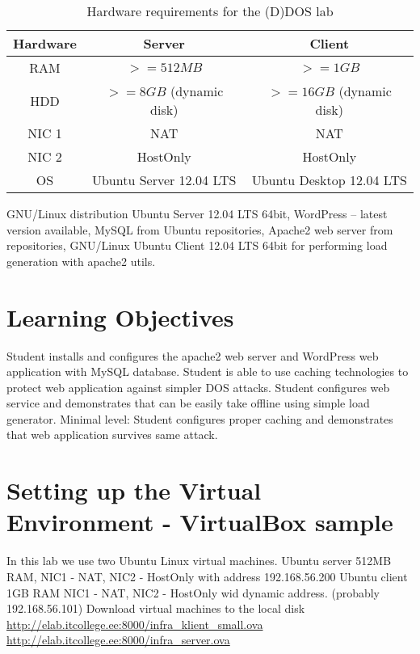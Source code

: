 \begin{table}
\centering
\caption{Hardware requirements for the (D)DOS lab}
\begin{tabular}{|c|c|c|}
\hline 
\rule[-1ex]{0pt}{2.5ex} Hardware & Server & Client \\ 
\hline 
\rule[-1ex]{0pt}{2.5ex} RAM & $>=512MB$ & $>=1GB$\\ 
\hline
\rule[-1ex]{0pt}{2.5ex} HDD & $>=8GB$ (dynamic disk) & $>=16GB$ (dynamic disk)\\ 
\hline 
\rule[-1ex]{0pt}{2.5ex} NIC 1 & NAT  & NAT \\ 
\hline 
\rule[-1ex]{0pt}{2.5ex} NIC 2 & HostOnly & HostOnly \\ 
\hline 
\rule[-1ex]{0pt}{2.5ex} OS & Ubuntu Server 12.04 LTS & Ubuntu Desktop 12.04 LTS\\ 
\hline 
\end{tabular}
\label{table:HW for Wordpress lab}
\end{table}

GNU/Linux distribution Ubuntu Server 12.04 LTS 64bit, WordPress -- latest version available, MySQL from Ubuntu repositories, Apache2 web server from repositories, GNU/Linux Ubuntu Client 12.04 LTS 64bit for performing load generation with apache2 utils.

\section{Learning Objectives}
Student installs and configures the apache2 web server and WordPress web application with \gls{MySQL} database.
Student is able to use caching technologies to protect web application against simpler DOS attacks. Student configures web service and demonstrates that can be
easily take offline using simple load generator. Minimal level: Student configures
proper caching and demonstrates that web application survives same attack.
\section{Setting up the Virtual Environment - VirtualBox sample}
In this lab we use two Ubuntu Linux virtual machines.
Ubuntu server 512MB RAM, NIC1 - NAT, NIC2 - HostOnly with address 192.168.56.200
Ubuntu client 1GB RAM NIC1 - NAT, NIC2 - HostOnly wid dynamic address. (probably 192.168.56.101)
Download virtual machines to the local disk
\url{http://elab.itcollege.ee:8000/infra_klient_small.ova}
\url{http://elab.itcollege.ee:8000/infra_server.ova}

